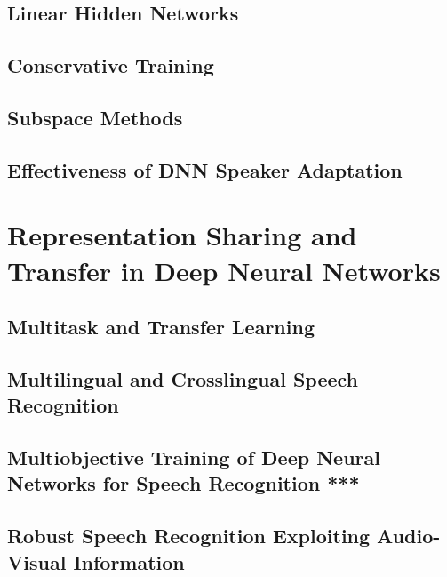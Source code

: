 \documentclass[a4paper]{article}
\begin{document}
\subsection{Linear Hidden Networks}

\subsection{Conservative Training}

\subsection{Subspace Methods}

\subsection{Effectiveness of DNN Speaker Adaptation}


\newpage
\section{Representation Sharing and Transfer in Deep Neural Networks}
\subsection{Multitask and Transfer Learning}

\subsection{Multilingual and Crosslingual Speech Recognition}

\subsection{Multiobjective Training of Deep Neural Networks for Speech Recognition ***}

\subsection{Robust Speech Recognition Exploiting Audio-Visual Information}
\end{document}
